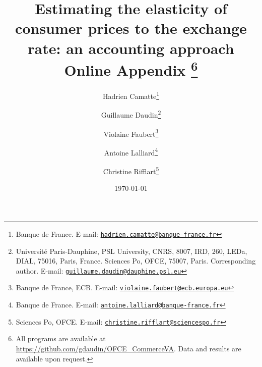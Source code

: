 \documentclass[11pt,a4paper]{article} %
\newcommand{\email}[1]{\href{mailto:#1}{\nolinkurl{#1}}}
\begin{document}
\title{Estimating the elasticity of consumer prices to the exchange rate: an accounting approach \\ Online Appendix	\thanks{ All programs are available at \url{https://github.com/gdaudin/OFCE_CommerceVA}. Data and results are available upon request.}\\
\vspace{1cm}
}
\vspace{1cm}
\date{\today}
\author{
	Hadrien Camatte\thanks{Banque de France. E-mail: \email{hadrien.camatte@banque-france.fr}}
	\and
	Guillaume Daudin\thanks{Université Paris-Dauphine, PSL University, CNRS, 8007, IRD, 260, LEDa, DIAL, 75016, Paris, France. Sciences Po, OFCE, 75007, Paris. Corresponding author. E-mail: \email{guillaume.daudin@dauphine.psl.eu}}
	\and
	Violaine Faubert\thanks{Banque de France, ECB. E-mail: \email{violaine.faubert@ecb.europa.eu}}
	\and
	Antoine Lalliard\thanks{Banque de France. E-mail: \email{antoine.lalliard@banque-france.fr}}
	\and
	Christine Rifflart\thanks{Sciences Po, OFCE. E-mail: \email{christine.rifflart@sciencespo.fr}}
}
\maketitle

\end{document}
